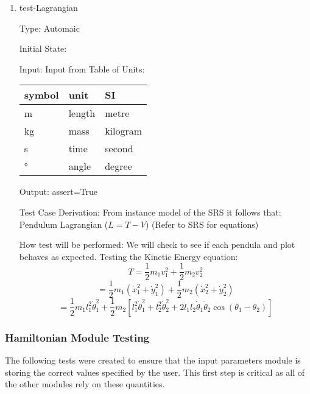 \documentclass[12pt, titlepage]{article}
\begin{document}
\begin{enumerate}				
	\item{test-Lagrangian\\}
	
	Type: Automaic 
	
	Initial State: 
	
	Input: Input from Table of Units:\\
  \noindent \begin{tabular}{l l l} 
    \toprule		
    \textbf{symbol} & \textbf{unit} & \textbf{SI}\\
    \midrule 
    \si{\metre} & length & metre\\
    \si{\kilogram} & mass & kilogram\\
    \si{\second} & time & second\\
    \si{\degree} & angle & degree\\
    \bottomrule
  \end{tabular}
	
	Output: assert=True
	
	Test Case Derivation: From instance model of the SRS it follows that:
	Pendulum Lagrangian ($L=T-V$)
	(Refer to SRS for equations)
	
	How test will be performed: We will check to see if each pendula and plot behaves as expected.
	Testing the Kinetic Energy equation:
	$$ T = \displaystyle\frac{1}{2}m_1v_1^2 + \frac{1}{2}m_2v_2^2 $$
$$ = \frac{1}{2}m_1(\dot{x}_1^2 + \dot{y}_1^2) + \frac{1}{2}m_2(\dot{x}_2^2 +
\dot{y}_2^2) $$
$$ = \frac{1}{2}m_1 l_1^2 \dot{\theta}_1^2 + \frac{1}{2}m_2\left[l_1^2
\dot{\theta}_1^2 + l_2^2 \dot{\theta}_2^2 + 2l_1l_2\dot{\theta}_1\dot{\theta}_2
\cos(\theta_1 - \theta_2)\right]$$
			
\end{enumerate} 

\subsubsection{\progname Hamiltonian Module Testing}

The following tests were created to ensure that the input parameters module is 
storing the correct values specified by the user. This first step is critical 
as all of the other modules rely on these quantities.
\end{document}
